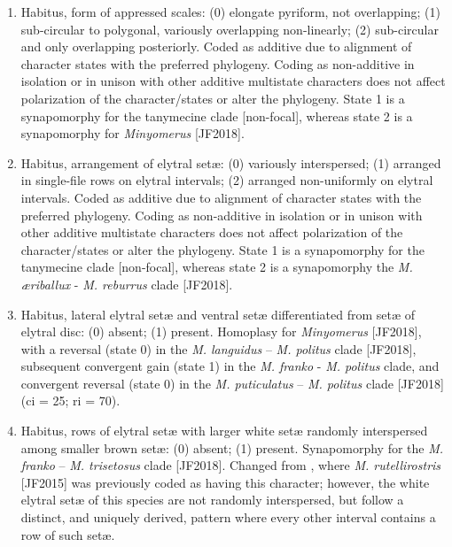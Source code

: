 \documentclass[fleqn,10pt,lineno]{wlpeerj} %
\begin{document}
	\begin{enumerate}
		\item Habitus, form of appressed scales: (0) elongate pyriform, not overlapping; (1) sub-circular to polygonal, variously overlapping non-linearly; (2) sub-circular and only overlapping posteriorly. Coded as additive due to alignment of character states with the preferred phylogeny. Coding as non-additive in isolation or in unison with other additive multistate characters does not affect polarization of the character/states or alter the phylogeny. State 1 is a synapomorphy for the tanymecine clade [non-focal], whereas state 2 is a synapomorphy for \textit{Minyomerus} [JF2018].
	 	
		\item Habitus, arrangement of elytral set{\ae}: (0) variously interspersed; (1) arranged in single-file rows on elytral intervals; (2) arranged non-uniformly on elytral intervals. Coded as additive due to alignment of character states with the preferred phylogeny. Coding as non-additive in isolation or in unison with other additive multistate characters does not affect polarization of the character/states or alter the phylogeny. State 1 is a synapomorphy for the tanymecine clade [non-focal], whereas state 2 is a synapomorphy the \textit{M. {\ae}riballux} - \textit{M. reburrus} clade [JF2018].
		
		\item Habitus, lateral elytral set{\ae} and ventral set{\ae} differentiated from set{\ae} of elytral disc: (0) absent; (1) present. Homoplasy for \textit{Minyomerus} [JF2018], with a reversal (state 0) in the \textit{M. languidus} – \textit{M. politus} clade [JF2018], subsequent convergent gain (state 1) in the \textit{M. franko} - \textit{M. politus} clade, and convergent reversal (state 0) in the \textit{M. puticulatus} – \textit{M. politus} clade [JF2018] (ci = 25; ri = 70).
	 	
	 	\item Habitus, rows of elytral set{\ae} with larger white set{\ae} randomly interspersed among smaller brown set{\ae}: (0) absent; (1) present. Synapomorphy for the \textit{M. franko} – \textit{M. trisetosus} clade [JF2018]. Changed from \citet{jansen2015}, where \textit{M. rutellirostris} [JF2015] was previously coded as having this character; however, the white elytral set{\ae} of this species are not randomly interspersed, but follow a distinct, and uniquely derived, pattern where every other interval contains a row of such set{\ae}.
	 	

\end{enumerate}
\end{document}
